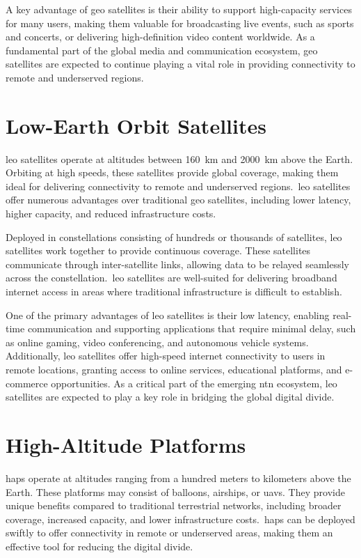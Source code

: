 A key advantage of \gls{geo} satellites is their ability to support high-capacity services for many users, making them valuable for broadcasting live events, such as sports and concerts, or delivering high-definition video content worldwide. As a fundamental part of the global media and communication ecosystem, \gls{geo} satellites are expected to continue playing a vital role in providing connectivity to remote and underserved regions.

\section{Low-Earth Orbit Satellites}

\gls{leo} satellites operate at altitudes between \SI{160}{\kilo\meter} and \SI{2000}{\kilo\meter} above the Earth. Orbiting at high speeds, these satellites provide global coverage, making them ideal for delivering connectivity to remote and underserved regions.\ \gls{leo} satellites offer numerous advantages over traditional \gls{geo} satellites, including lower latency, higher capacity, and reduced infrastructure costs.

Deployed in constellations consisting of hundreds or thousands of satellites, \gls{leo} satellites work together to provide continuous coverage. These satellites communicate through inter-satellite links, allowing data to be relayed seamlessly across the constellation.\ \gls{leo} satellites are well-suited for delivering broadband internet access in areas where traditional infrastructure is difficult to establish.

One of the primary advantages of \gls{leo} satellites is their low latency, enabling real-time communication and supporting applications that require minimal delay, such as online gaming, video conferencing, and autonomous vehicle systems. Additionally, \gls{leo} satellites offer high-speed internet connectivity to users in remote locations, granting access to online services, educational platforms, and e-commerce opportunities. As a critical part of the emerging \gls{ntn} ecosystem, \gls{leo} satellites are expected to play a key role in bridging the global digital divide.

\section{High-Altitude Platforms}

\glspl{hap} operate at altitudes ranging from a hundred meters to kilometers above the Earth. These platforms may consist of balloons, airships, or \glspl{uav}. They provide unique benefits compared to traditional terrestrial networks, including broader coverage, increased capacity, and lower infrastructure costs.\ \glspl{hap} can be deployed swiftly to offer connectivity in remote or underserved areas, making them an effective tool for reducing the digital divide.


